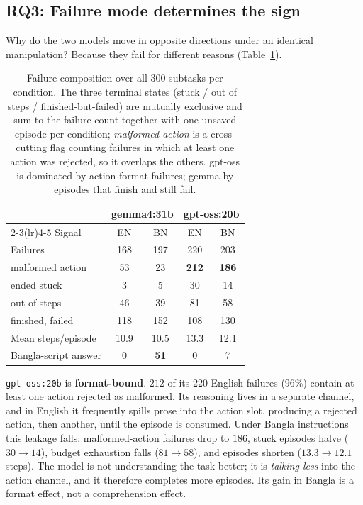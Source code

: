 \documentclass[11pt]{article}
\begin{document}
\subsection{RQ3: Failure mode determines the sign}

Why do the two models move in opposite directions under an identical manipulation? Because they
fail for different reasons (Table~\ref{tab:modes}).

\begin{table}[t]
\centering\small
\begin{tabular}{lcccc}
\toprule
 & \multicolumn{2}{c}{gemma4:31b} & \multicolumn{2}{c}{gpt-oss:20b} \\
\cmidrule(lr){2-3}\cmidrule(lr){4-5}
Signal & EN & BN & EN & BN \\
\midrule
Failures            & 168 & 197 & 220 & 203 \\
\;\;malformed action & 53 & 23 & \textbf{212} & \textbf{186} \\
\;\;ended stuck      & 3 & 5 & 30 & 14 \\
\;\;out of steps     & 46 & 39 & 81 & 58 \\
\;\;finished, failed & 118 & 152 & 108 & 130 \\
\midrule
Mean steps/episode   & 10.9 & 10.5 & 13.3 & 12.1 \\
Bangla-script answer & 0 & \textbf{51} & 0 & 7 \\
\bottomrule
\end{tabular}
\caption{Failure composition over all 300 subtasks per condition. The three terminal states
(stuck / out of steps / finished-but-failed) are mutually exclusive and sum to the failure count
together with one unsaved episode per condition; \emph{malformed action} is a cross-cutting flag
counting failures in which at least one action was rejected, so it overlaps the others. gpt-oss
is dominated by action-format failures; gemma by episodes that finish and still fail.}
\label{tab:modes}
\end{table}

\texttt{gpt-oss:20b} is \textbf{format-bound}. $212$ of its $220$ English failures ($96\%$)
contain at least one action rejected as malformed. Its reasoning lives in a separate channel,
and in English it frequently spills prose into the action slot, producing a rejected action,
then another, until the episode is consumed. Under Bangla instructions this leakage falls:
malformed-action failures drop to $186$, stuck episodes halve ($30\rightarrow14$), budget
exhaustion falls ($81\rightarrow58$), and episodes shorten ($13.3\rightarrow12.1$ steps). The
model is not understanding the task better; it is \emph{talking less} into the action channel,
and it therefore completes more episodes. Its gain in Bangla is a format effect, not a
comprehension effect.
\end{document}
